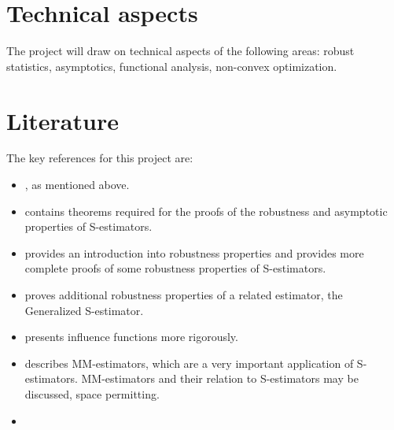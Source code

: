 \documentclass[]{STAT_547C}
\begin{document}
\section{Technical aspects}

The project will draw on technical aspects of the following areas: robust statistics, asymptotics, functional analysis, non-convex optimization.



\section{Literature}

The key references for this project are:

\begin{itemize}
  \item \cite{rousseeuw1984robust}, as mentioned above.
  \item \cite{rousseeuw1984least} contains theorems required for the proofs of the robustness and asymptotic properties of S-estimators.
  \item \cite[Ch.~3]{maronna2019robust} provides an introduction into robustness properties and \cite[Ch.~5]{maronna2019robust} provides more complete proofs of some robustness properties of S-estimators.
  \item \cite{croux1994generalized} proves additional robustness properties of a related estimator, the Generalized S-estimator.
  \item \cite[Ch.~2]{hampel2011robust} presents influence functions more rigorously.
  \item \cite{yohai1987high} describes MM-estimators, which are a very important application of S-estimators. MM-estimators and their relation to S-estimators may be discussed, space permitting.
  \item \
  
\end{itemize}
\end{document}
